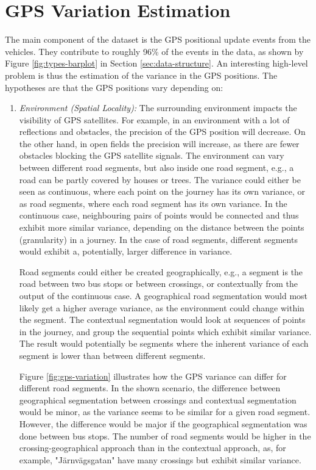 \chapter{GPS Variation Estimation}
\label{cha:GPS-variation-estimation}

The main component of the dataset is the GPS positional update events from the vehicles.
They contribute to roughly 96\% of the events in the data, as shown by Figure \ref{fig:types-barplot} in Section \ref{sec:data-structure}.
An interesting high-level problem is thus the estimation of the variance in the GPS positions.
The hypotheses are that the GPS positions vary depending on:
\begin{enumerate}
    \item \textit{Environment (Spatial Locality):} 
    The surrounding environment impacts the visibility of GPS satellites. 
    For example, in an environment with a lot of reflections and obstacles, the precision of the GPS position will decrease.
    On the other hand, in open fields the precision will increase, as there are fewer obstacles blocking the GPS satellite signals.
    The environment can vary between different road segments, but also inside one road segment, e.g., a road can be partly covered by houses or trees.
    The variance could either be seen as continuous, where each point on the journey has its own variance, or as road segments, where each road segment has its own variance.
    In the continuous case, neighbouring pairs of points would be connected and thus exhibit more similar variance, depending on the distance between the points (granularity) in a journey.
    In the case of road segments, different segments would exhibit a, potentially, larger difference in variance.
    
    Road segments could either be created geographically, e.g., a segment is the road between two bus stops or between crossings, or contextually from the output of the continuous case.
    A geographical road segmentation would most likely get a higher average variance, as the environment could change within the segment.
    The contextual segmentation would look at sequences of points in the journey, and group the sequential points which exhibit similar variance.
    The result would potentially be segments where the inherent variance of each segment is lower than between different segments.

    Figure \ref{fig:gps-variation} illustrates how the GPS variance can differ for different road segments.
    In the shown scenario, the difference between geographical segmentation between crossings and contextual segmentation would be minor, as the variance seems to be similar for a given road segment.
    However, the difference would be major if the geographical segmentation was done between bus stops.
    The number of road segments would be higher in the crossing-geographical approach than in the contextual approach, as, for example, "Järnvägsgatan" have many crossings but exhibit similar variance. 
    


\end{enumerate}
